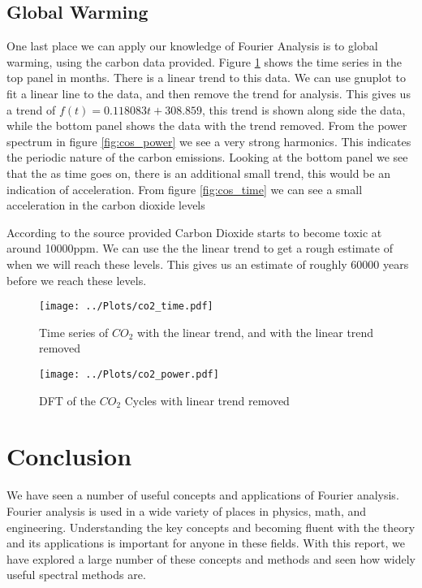 \documentclass[twocolumn]{myarticle}
\begin{document}
\subsection{Global Warming}
One last place we can apply our knowledge of Fourier Analysis is to global warming, using the carbon data provided. 
Figure \ref{fig:co2_time} shows the time series in the top panel in months. 
There is a linear trend to this data. 
We can use gnuplot to fit a linear line to the data, and then remove the trend for analysis. 
This gives us a trend of $f(t) = 0.118083t + 308.859$, this trend is shown along side the data, while the bottom panel shows the data with the trend removed. 
From the power spectrum in figure \ref{fig:cos_power} we see a very strong harmonics. 
This indicates the periodic nature of the carbon emissions. 
Looking at the bottom panel we see that the as time goes on, there is an additional small trend, this would be an indication of acceleration. 
From figure \ref{fig:cos_time} we can see a small acceleration in the carbon dioxide levels

According to the source provided Carbon Dioxide starts to become toxic at around 10000ppm. 
We can use the the linear trend to get a rough estimate of when we will reach these levels. 
This gives us an estimate of roughly 60000 years before we reach these levels. 


\begin{figure}[ht]
    \centering
    \texttt{[image: ../Plots/co2\_time.pdf]}
    \caption{Time series of $CO_{2}$ with the linear trend, and with the linear trend removed}
    \label{fig:co2_time}
\end{figure}

\begin{figure}[ht]
    \centering
    \texttt{[image: ../Plots/co2\_power.pdf]}
    \caption{DFT of the $CO_{2}$ Cycles with linear trend removed}
    \label{fig:co2_power}
\end{figure}

\section{Conclusion}
\label{sec:conclusion}

We have seen a number of useful concepts and applications of Fourier analysis.
Fourier analysis is used in a wide variety of places in physics, math, and engineering.
Understanding the key concepts and becoming fluent with the theory and its applications is important for anyone in these fields.
With this report, we have explored a large number of these concepts and methods and seen how widely useful spectral methods are.
\end{document}
